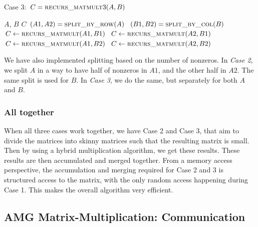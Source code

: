 \begin{algorithm}[H] 
  \caption{Case 3: $C = \textsc{recurs\_matmult}3(A, B)$} \label{alg:case3} 
  \begin{algorithmic}[1]
    \Require $A$, $B$
    \Ensure  $C$
    \State $(A1, A2) = \textsc{split\_by\_row}(A)$
    \State $(B1, B2) = \textsc{split\_by\_col}(B)$
    \State $C \leftarrow \textsc{recurs\_matmult}(A1,B1)$
    \State $C \leftarrow \textsc{recurs\_matmult}(A2,B1)$
    \State $C \leftarrow \textsc{recurs\_matmult}(A1,B2)$
    \State $C \leftarrow \textsc{recurs\_matmult}(A2,B2)$
  \end{algorithmic}
\end{algorithm}

We have also implemented splitting based on the number of nonzeros. In \textit{Case 2}, we split $A$ in a way to have half of nonzeros in $A1$, and the other half in $A2$. The same split is used for $B$. In \textit{Case 3}, we do the same, but separately for both $A$ and $B$.

\subsubsection{All together}

When all three cases work together, we have Case 2 and Case 3, that aim to divide the matrices into skinny matrices such that the resulting matrix is small. Then by using a hybrid multiplication algorithm, we get these results. These results are then accumulated and merged together. From a memory access perspective, the accumulation and merging required for Case 2 and 3 is structured access to the matrix, with the only random access happening during Case 1. This makes the overall algorithm very efficient. 

\subsection{AMG Matrix-Multiplication: Communication}
\label{sec:amg}

